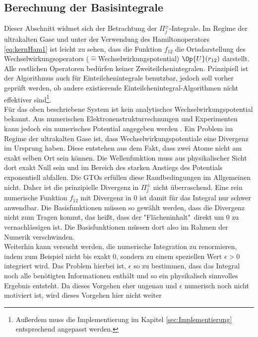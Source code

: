 \subsection{Berechnung der Basisintegrale}
%
Dieser Abschnitt widmet sich der Betrachtung der $\Pi_j^\pm$-Integrale. Im 
Regime der ultrakalten Gase und unter der Verwendung des Hamiltonoperators 
\ref{eq:kernHam1} ist leicht zu sehen, dass die Funktion $f_{12}$ die 
Ortsdarstellung des Wechselwirkungsoperators 
($\hat{=}$Wechselwirkungspotential) 
$\Op{U}(r_{12})$ darstellt. Alle restlichen Operatoren 
bedürfen keiner 
Zweiteilchenintegralen. Prinzipiell ist der Algorithmus auch für 
Einteilchenintegrale benutzbar, jedoch soll vorher geprüft 
werden, ob andere 
existierende Einteilchenintegral-Algorithmen nicht effektiver 
sind\footnote{Außerdem muss die Implementierung im Kapitel 
\ref{sec:Implementierung} entsprechend angepasst werden.}.\\
Für das oben beschriebene System ist kein analytisches 
Wechselwirkungspotential bekannt. Aus numerischen Elektronenstrukturrechnungen 
und Experimenten kann jedoch ein numerisches Potential angegeben werden 
\cite{phdthesis:sergey}. Ein Problem im Regime der 
ultrakalten Gase ist,  dass Wechselwirkungspotentiale eine 
Divergenz im Ursprung haben. Diese entstehen aus dem Fakt, dass zwei Atome 
nicht am exakt selben Ort sein können. Die Wellenfunktion muss aus 
physikalischer Sicht dort exakt Null sein und im Bereich des starken Anstiegs 
des Potentials exponentiell abfallen. Die GTOs erfüllen diese Randbedingungen 
im Allgemeinen nicht. Daher ist die prinzipielle Divergenz in $\Pi^\pm_j$ nicht 
überraschend. Eine rein numerische Funktion $f_{12}$ mit Divergenz in 0 ist 
damit für das Integral nur schwer anwendbar. Die 
Basisfunktionen müssen so 
gewählt werden, dass die Divergenz nicht zum Tragen kommt, 
das heißt, dass der 
"Flächeninhalt"\ direkt um 0 zu vernachlässigen ist. Die 
Basisfunktionen müssen 
dort also im Rahmen der Numerik verschwinden.\\%
Weiterhin kann versucht werden, die numerische Integration zu 
renormieren, indem 
zum Beispiel nicht bis exakt 0, sondern zu einem speziellen Wert $\epsilon>0$  
integriert wird. Das Problem hierbei ist, $\epsilon$ so zu bestimmen, dass das 
Integral noch alle benötigten Informationen enthält und so ein physikalisch 
sinnvolles Ergebnis entsteht. Da dieses Vorgehen eher ungenau und $\epsilon$ 
numerisch noch nicht motiviert ist, wird dieses Vorgehen hier nicht weiter 
